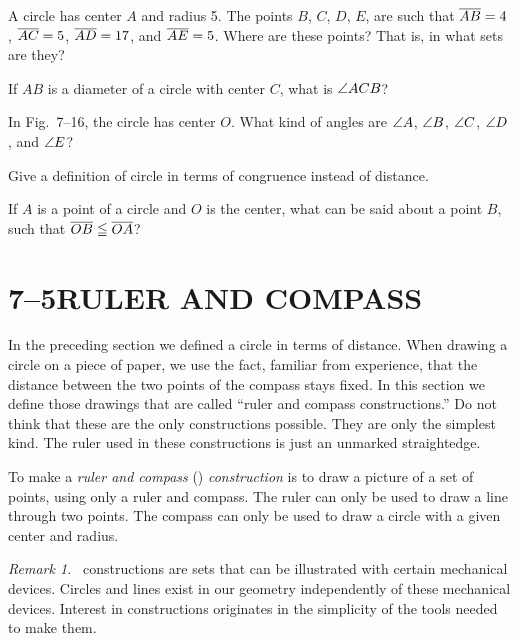 \documentclass[11pt]{book}
\newenvironment{VIIremarkn}[1]%
  {\par\medskip\noindent\emph{Remark #1.}\ }{\par\medskip}
\begin{document}
\FIGVIIFIFTEEN

\begin{exercisecols}
\begin{exlist}
\item A circle has center $A$ and radius 5. The points $B$, $C$, $D$, $E$, are
  such that $\overline{AB} = 4$, $\overline{AC} = 5$, $\overline{AD} = 17$, and $\overline{AE} = 5$.
  Where are these points? That is, in what sets are they?
\item If $AB$ is a diameter of a circle with center $C$, what is $\angle ACB$?
\item In Fig.~7--16, the circle has center $O$. What kind of angles are
  $\angle A$, $\angle B$, $\angle C$, $\angle D$, and $\angle E$?
\exfig{\FIGVIISIXTEEN}
\item Give a definition of circle in terms of congruence instead of distance.
\item If $A$ is a point of a circle and $O$ is the center, what can be said
  about a point $B$, such that $\overline{OB} \leqq \overline{OA}$?
\end{exlist}
\end{exercisecols}

\section*{7--5\quad RULER AND COMPASS}

In the preceding section we defined a circle in terms of distance. When drawing
a circle on a piece of paper, we use the fact, familiar from experience, that
the distance between the two points of the compass stays fixed. In this section
we define those drawings that are called ``ruler and compass constructions.''
Do not think that these are the only constructions possible. They are only the
simplest kind. The ruler used in these constructions is just an unmarked
straightedge.

\FIGVIISEVENTEEN

\begin{definition}
To make a \emph{ruler and compass} (\RC) \emph{construction} is to draw a
picture of a set of points, using only a ruler and compass. The ruler can only
be used to draw a line through two points. The compass can only be used to
draw a circle with a given center and radius.
\end{definition}

\begin{VIIremarkn}{1}
\RC{} constructions are sets that can be illustrated with certain mechanical
devices. Circles and lines exist in our geometry independently of these
mechanical devices. Interest in \RC{} constructions originates in the
simplicity of the tools needed to make them.
\end{VIIremarkn}
\end{document}
